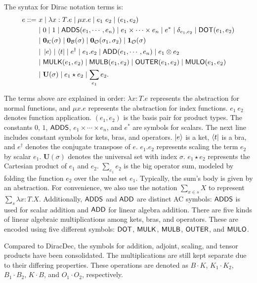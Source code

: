 \documentclass[runningheads]{llncs}
\begin{document}
\begin{definition}
    The syntax for Dirac notation terms is:
    \begin{align*}
        e ::=\ & x \mid \lambda x : T.e \mid \mu x.e \mid e_1\ e_2 \mid (e_1, e_2) \\
        & |\ 0 \mid 1 \mid \mathsf{ADDS}(e_1, \cdots, e_n) \mid e_1 \times \cdots \times e_n \mid e^* \mid \delta_{e_1, e_2} \mid \mathsf{DOT}(e_1, e_2) \\
        & |\ \mathbf{0}_\mathcal{K}(\sigma) \mid \mathbf{0}_\mathcal{B}(\sigma) \mid \mathbf{0}_\mathcal{O}(\sigma_1, \sigma_2) \mid \mathbf{1}_\mathcal{O}(\sigma) \\
        & |\ \ket{e} \mid \bra{t} \mid e^\dagger \mid e_1.e_2 \mid \mathsf{ADD}(e_1, \cdots, e_n) \mid e_1 \otimes e_2 \\
        & |\ \mathsf{MULK}(e_1, e_2) \mid \mathsf{MULB}(e_1, e_2) \mid \mathsf{OUTER}(e_1, e_2) \mid \mathsf{MULO}(e_1, e_2) \\
        & |\ \mathbf{U}(\sigma) \mid e_1 \star e_2 \mid \sum_{e_1} e_2.
    \end{align*}
\end{definition}
The terms above are explained in order:
\( \lambda x : T.e \) represents the abstraction for normal functions, and \( \mu x.e \) represents the abstraction for index functions.
\( e_1\ e_2 \) denotes function application.
\( (e_1, e_2) \) is the basis pair for product types.
The constants \( 0 \), \( 1 \), \( \mathsf{ADDS} \), \( e_1 \times \cdots \times e_n \), and \( e^* \) are symbols for scalars.
The next line includes constant symbols for kets, bras, and operators.
\( \ket{e} \) is a ket, \( \bra{t} \) is a bra, and \( e^\dagger \) denotes the conjugate transpose of \( e \).
\( e_1.e_2 \) represents scaling the term \( e_2 \) by scalar \( e_1 \).
\( \mathbf{U}(\sigma) \) denotes the universal set with index \( \sigma \).
\( e_1 \star e_2 \) represents the Cartesian product of \( e_1 \) and \( e_2 \).
\( \sum_{e_1} e_2 \) is the big operator sum, modeled by folding the function \( e_2 \) over the value set \( e_1 \). Typically, the sum's body is given by an abstraction. For convenience, we also use the notation \( \sum_{x \in s} X \) to represent \( \sum_{s} \lambda x : T . X \).
Additionally, \( \mathsf{ADDS} \) and \( \mathsf{ADD} \) are distinct AC symbols: \( \mathsf{ADDS} \) is used for scalar addition and \( \mathsf{ADD} \) for linear algebra addition.
There are five kinds of linear algebraic multiplications among kets, bras, and operators. These are encoded using five different symbols: \( \mathsf{DOT} \), \( \mathsf{MULK} \), \( \mathsf{MULB} \), \( \mathsf{OUTER} \), and \( \mathsf{MULO} \).

Compared to DiracDec, the symbols for addition, adjoint, scaling, and tensor products have been consolidated.
The multiplications are still kept separate due to their differing properties.
These operations are denoted as \( B \cdot K \), \( K_1 \cdot K_2 \), \( B_1 \cdot B_2 \), \( K \cdot B \), and \( O_1 \cdot O_2 \), respectively.
\end{document}

